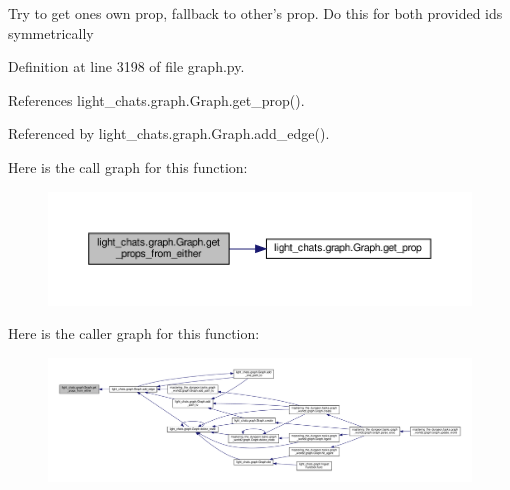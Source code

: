 \begin{DoxyVerb}Try to get ones own prop, fallback to other's prop. Do this for
both provided ids symmetrically\end{DoxyVerb}
 

Definition at line 3198 of file graph.\+py.



References light\+\_\+chats.\+graph.\+Graph.\+get\+\_\+prop().



Referenced by light\+\_\+chats.\+graph.\+Graph.\+add\+\_\+edge().

Here is the call graph for this function\+:
\nopagebreak
\begin{figure}[H]
\begin{center}
\leavevmode
\includegraphics[width=350pt]{classlight__chats_1_1graph_1_1Graph_ad12090e48ff11063ece35c115b91d2aa_cgraph}
\end{center}
\end{figure}
Here is the caller graph for this function\+:
\nopagebreak
\begin{figure}[H]
\begin{center}
\leavevmode
\includegraphics[width=350pt]{classlight__chats_1_1graph_1_1Graph_ad12090e48ff11063ece35c115b91d2aa_icgraph}
\end{center}
\end{figure}
\mbox{\label{classlight__chats_1_1graph_1_1Graph_a7b3fe43bf1e2b53fe7a2e22a24d77ef2}} 

